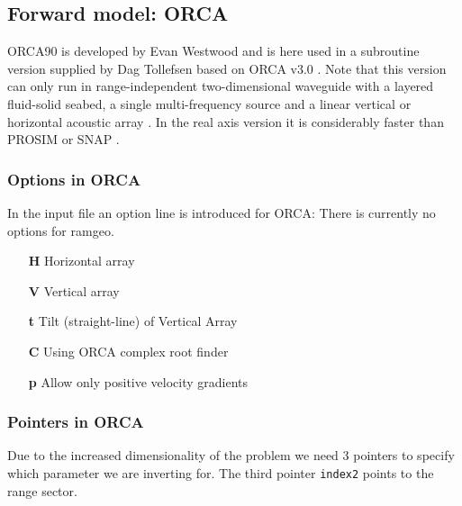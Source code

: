 \documentclass{saclantc}
\begin{document}
\subsection{Forward model: ORCA }

{\sf ORCA90} \cite{levinson:asa95,westwood:asa96}  is developed by
Evan Westwood and is here used in a subroutine version supplied by Dag
Tollefsen \cite{tollefsen02} based on ORCA v3.0 \cite{westwood03}. 
Note that this version can only run in range-independent
two-dimensional waveguide with a layered fluid-solid seabed, a single
multi-frequency source and a linear vertical or horizontal acoustic array \cite{tollefsen02}.
In the real axis version it is
considerably faster than {\sf PROSIM } or {\sf SNAP }.


\subsubsection{Options in ORCA}
In the input file an option line is introduced for {\sf ORCA}:
There is currently no options for ramgeo.
\begin{itemize}
 \item[\bf H]  Horizontal array
 \item[\bf V]  Vertical array
 \item[\bf t]  Tilt (straight-line) of Vertical Array
 \item[\bf C]  Using ORCA complex root finder
 \item[\bf p]   Allow only positive velocity gradients

\end{itemize}


\subsubsection{Pointers in ORCA}
\label{se:orcaopoint}
Due to the increased dimensionality of the problem we need 3 pointers to specify
which parameter we are inverting for. The third pointer {\tt index2} points to the range sector.
\end{document}
